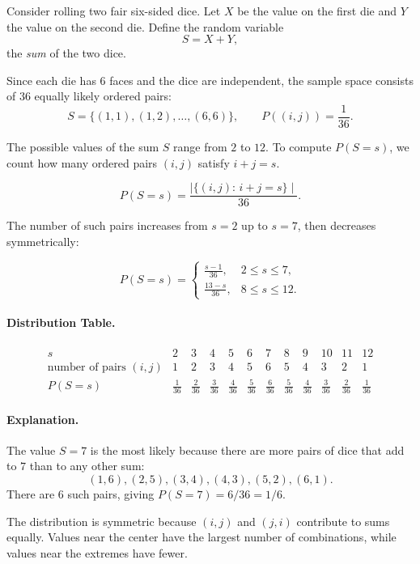 \begin{example}
Consider rolling two fair six-sided dice. Let $X$ be the value on the first die
and $Y$ the value on the second die. Define the random variable
\[
S = X + Y,
\]
the \emph{sum} of the two dice.

Since each die has 6 faces and the dice are independent, the sample space
consists of $36$ equally likely ordered pairs:
\[
S = \{(1,1), (1,2), \dots, (6,6)\}, \qquad P((i,j)) = \frac{1}{36}.
\]

The possible values of the sum $S$ range from $2$ to $12$.
To compute $P(S = s)$, we count how many ordered pairs $(i,j)$ satisfy $i+j=s$.

\[
P(S = s)=\frac{\mid\{(i,j):\, i+j=s\}\mid}{36}.
\]

The number of such pairs increases from $s=2$ up to $s=7$, then decreases symmetrically:

\[
P(S = s)=
\begin{cases}
\frac{s-1}{36}, & 2 \le s \le 7,\\[6pt]
\frac{13-s}{36}, & 8 \le s \le 12.
\end{cases}
\]

\paragraph{Distribution Table.}  
\[
\begin{array}{c|ccccccccccc}
s & 2 & 3 & 4 & 5 & 6 & 7 & 8 & 9 & 10 & 11 & 12 \\ \hline
\text{number of pairs }(i,j) & 1 & 2 & 3 & 4 & 5 & 6 & 5 & 4 & 3 & 2 & 1 \\
P(S=s) & \frac{1}{36} & \frac{2}{36} & \frac{3}{36} & \frac{4}{36} &
\frac{5}{36} & \frac{6}{36} & \frac{5}{36} & \frac{4}{36} &
\frac{3}{36} & \frac{2}{36} & \frac{1}{36}
\end{array}
\]

\paragraph{Explanation.}
The value $S=7$ is the most likely because there are more pairs of dice that add
to $7$ than to any other sum:
\[
(1,6), (2,5), (3,4), (4,3), (5,2), (6,1).
\]
There are $6$ such pairs, giving $P(S=7)=6/36=1/6$.

The distribution is symmetric because $(i,j)$ and $(j,i)$ contribute to sums
equally. Values near the center have the largest number of combinations, while
values near the extremes have fewer.
\end{example}
